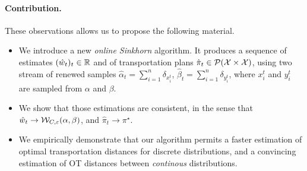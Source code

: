 \paragraph{Contribution.}These observations allows us to propose the following
material.
\begin{itemize}
    \item We introduce a new \textit{online Sinkhorn} algorithm. It produces a sequence of
    estimates $(\hat w_t)_t \in \mathbb{R}$ and of transportation plans $\hat \pi_t \in
    \mathcal{P}(\mathcal{X} \times \mathcal{X})$, using two stream of renewed samples $\hat \alpha_t =
    \sum_{i=1}^n \delta_{x^t_i}$, $\hat \beta_t = \sum_{i=1}^n \delta_{y^t_i}$,
    where $x^t_i$ and $y^t_i$ are sampled from $\alpha$ and $\beta$.
    \item We show that those estimations are consistent, in the sense that $\hat
    w_t \to \mathcal{W}_{C,\varepsilon}(\alpha, \beta)$, and $\hat \pi_t \to \pi^\star$.
    \item We empirically demonstrate that our algorithm permits a faster
    estimation of optimal transportation distances for discrete distributions,
    and a convincing estimation of OT distances between \textit{continous} distributions.
\end{itemize}